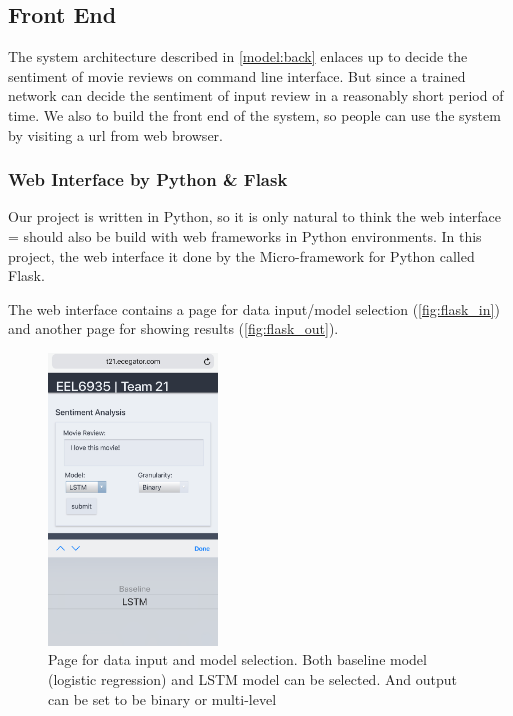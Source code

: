 \documentclass[conference]{IEEEtran}
\begin{document}
\subsection{Front End}
\label{model:front}

    The system architecture described in \autoref{model:back} enlaces up to decide the
    sentiment of movie reviews on command line interface. But since a trained network can
    decide the sentiment of input review in a reasonably short period of time. We also
    to build the front end of the system, so people can use the system by visiting a
    url from web browser.

\subsubsection{Web Interface by Python \& Flask}
\label{model:front:web}
    Our project is written in Python, so it is only natural to think the web interface =
    should also be build with web frameworks in Python environments.
    In this project, the web interface it done by the Micro-framework for
    Python called Flask\cite{ronacher2010flask,grinberg2018flask}.

    The web interface contains a page for data input/model selection
    (\autoref{fig:flask_in}) and another page for
    showing results (\autoref{fig:flask_out}).

    \begin{figure}
        \center\includegraphics[width=0.4\textwidth]{figure/flask_input}
        \caption{Page for data input and model selection. Both baseline model (logistic
        regression) and LSTM model can be selected. And output can be set to be binary
        or multi-level}
        \label{fig:flask_in}
    \end{figure}
\end{document}
